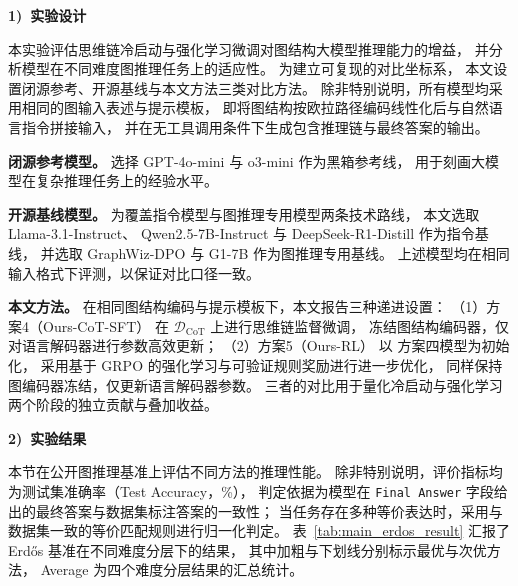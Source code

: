 \textbf{1)\ 实验设计}

本实验评估思维链冷启动与强化学习微调对图结构大模型推理能力的增益，
并分析模型在不同难度图推理任务上的适应性。
为建立可复现的对比坐标系，
本文设置闭源参考、开源基线与本文方法三类对比方法。
除非特别说明，所有模型均采用相同的图输入表述与提示模板，
即将图结构按欧拉路径编码线性化后与自然语言指令拼接输入，
并在无工具调用条件下生成包含推理链与最终答案的输出。

\textbf{闭源参考模型。}
选择 GPT-4o-mini\cite{Hurst2024GPT4oSC} 与 o3-mini\cite{ZhangOpenAIOS} 作为黑箱参考线，
用于刻画大模型在复杂推理任务上的经验水平。

\textbf{开源基线模型。}
为覆盖指令模型与图推理专用模型两条技术路线，
本文选取 Llama-3.1-Instruct\cite{grattafiori2024llama3}、
Qwen2.5-7B-Instruct\cite{Yang2024Qwen25TR} 与 DeepSeek-R1-Distill\cite{DeepSeekAI2025DeepSeekR1IR}
作为指令基线，
并选取 GraphWiz-DPO\cite{Chen2024GraphWizAI} 与 G1-7B\cite{Guo2025G1TL}
作为图推理专用基线。
上述模型均在相同输入格式下评测，以保证对比口径一致。

\textbf{本文方法。}
在相同图结构编码与提示模板下，本文报告三种递进设置：
{（1）方案4（Ours-CoT-SFT）} 在 $\mathcal{D}_{\mathrm{CoT}}$ 上进行思维链监督微调，
冻结图结构编码器，仅对语言解码器进行参数高效更新；
{（2）方案5（Ours-RL）} 以 方案四模型为初始化，
采用基于 GRPO 的强化学习与可验证规则奖励进行进一步优化，
同样保持图编码器冻结，仅更新语言解码器参数。
三者的对比用于量化冷启动与强化学习两个阶段的独立贡献与叠加收益。



\textbf{2)\ 实验结果}

本节在公开图推理基准上评估不同方法的推理性能。
除非特别说明，评价指标均为测试集准确率（Test Accuracy，\%），
判定依据为模型在 \texttt{Final Answer} 字段给出的最终答案与数据集标注答案的一致性；
当任务存在多种等价表达时，采用与数据集一致的等价匹配规则进行归一化判定。
表~\ref{tab:main_erdos_result} 汇报了 Erd\H{o}s\cite{Guo2025G1TL} 基准在不同难度分层下的结果，
其中加粗与下划线分别标示最优与次优方法，
Average 为四个难度分层结果的汇总统计。


